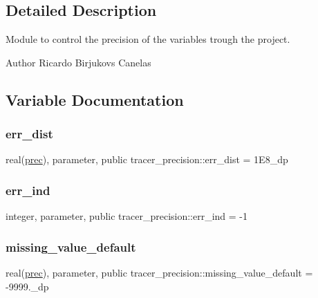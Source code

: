 \subsection{Detailed Description}
Module to control the precision of the variables trough the project. 

\begin{DoxyAuthor}{Author}
Ricardo Birjukovs Canelas 
\end{DoxyAuthor}


\subsection{Variable Documentation}
\mbox{\label{namespacetracer__precision_ac58a793d67c36de01068a6315cb0211f}} 
\subsubsection{\texorpdfstring{err\+\_\+dist}{err\_dist}}
{\footnotesize\ttfamily real(\mbox{\hyperlink{namespacetracer__precision_a8a01094f67c69ab389329d205a7c4cc6}{prec}}), parameter, public tracer\+\_\+precision\+::err\+\_\+dist = 1\+E8\+\_\+dp}

\mbox{\label{namespacetracer__precision_a8a4267e1aa9cc99d32b65d07cb31cb2a}} 
\subsubsection{\texorpdfstring{err\+\_\+ind}{err\_ind}}
{\footnotesize\ttfamily integer, parameter, public tracer\+\_\+precision\+::err\+\_\+ind = -\/1}

\mbox{\label{namespacetracer__precision_ac24699f2eab5a0427f3ec0f8f7715a40}} 
\subsubsection{\texorpdfstring{missing\+\_\+value\+\_\+default}{missing\_value\_default}}
{\footnotesize\ttfamily real(\mbox{\hyperlink{namespacetracer__precision_a8a01094f67c69ab389329d205a7c4cc6}{prec}}), parameter, public tracer\+\_\+precision\+::missing\+\_\+value\+\_\+default = -\/9999.\+\_\+dp}

